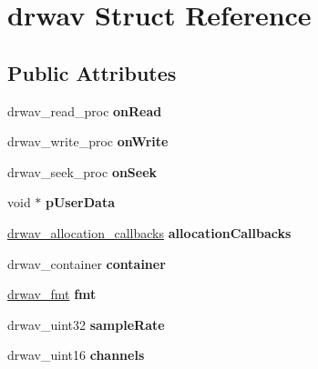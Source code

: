 \hypertarget{structdrwav}{\section{drwav Struct Reference}
\label{structdrwav}
}
\subsection*{Public Attributes}
\begin{DoxyCompactItemize}
\item 
\hypertarget{structdrwav_ab08d1b37037df5b2af88cc549d93b550}{drwav\-\_\-read\-\_\-proc {\bfseries on\-Read}}\label{structdrwav_ab08d1b37037df5b2af88cc549d93b550}

\item 
\hypertarget{structdrwav_a1ca22d7ee1b573fe1d758e131f486e60}{drwav\-\_\-write\-\_\-proc {\bfseries on\-Write}}\label{structdrwav_a1ca22d7ee1b573fe1d758e131f486e60}

\item 
\hypertarget{structdrwav_a71fa3abce7f96f79ba2e791fb97ed256}{drwav\-\_\-seek\-\_\-proc {\bfseries on\-Seek}}\label{structdrwav_a71fa3abce7f96f79ba2e791fb97ed256}

\item 
\hypertarget{structdrwav_a99247627375ce8b99dbd26eb4540a10a}{void $\ast$ {\bfseries p\-User\-Data}}\label{structdrwav_a99247627375ce8b99dbd26eb4540a10a}

\item 
\hypertarget{structdrwav_a6c29e2b12103ca5e7dae69367993d83e}{\hyperlink{structdrwav__allocation__callbacks}{drwav\-\_\-allocation\-\_\-callbacks} {\bfseries allocation\-Callbacks}}\label{structdrwav_a6c29e2b12103ca5e7dae69367993d83e}

\item 
\hypertarget{structdrwav_a287fdd02d1fd755e827609b857141cbe}{drwav\-\_\-container {\bfseries container}}\label{structdrwav_a287fdd02d1fd755e827609b857141cbe}

\item 
\hypertarget{structdrwav_a85813f6f6280c2b79abff00aa332e78a}{\hyperlink{structdrwav__fmt}{drwav\-\_\-fmt} {\bfseries fmt}}\label{structdrwav_a85813f6f6280c2b79abff00aa332e78a}

\item 
\hypertarget{structdrwav_a6f3a893019f8b2b0bcc1939d48ae2da5}{drwav\-\_\-uint32 {\bfseries sample\-Rate}}\label{structdrwav_a6f3a893019f8b2b0bcc1939d48ae2da5}

\item 
\hypertarget{structdrwav_a62c845e3c6f6309850c42cd64ea6616e}{drwav\-\_\-uint16 {\bfseries channels}}\label{structdrwav_a62c845e3c6f6309850c42cd64ea6616e}


\end{DoxyCompactItemize}
